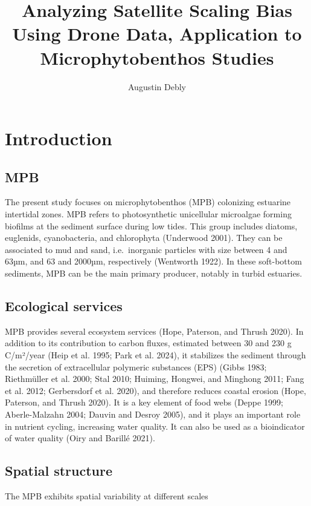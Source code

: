 \documentclass[
  letterpaper,
  DIV=11,
  numbers=noendperiod]{scrartcl}
\title{Analyzing Satellite Scaling Bias Using Drone Data, Application to
Microphytobenthos Studies}
\author{Augustin Debly}
\date{}
\begin{document}
\maketitle

\section{Introduction}\label{introduction}

\subsection{MPB}\label{mpb}

The present study focuses on microphytobenthos (MPB) colonizing
estuarine intertidal zones. MPB refers to photosynthetic unicellular
microalgae forming biofilms at the sediment surface during low tides.
This group includes diatoms, euglenids, cyanobacteria, and chlorophyta
(Underwood 2001). They can be associated to mud and sand, i.e.~inorganic
particles with size between 4 and 63µm, and 63 and 2000µm, respectively
(Wentworth 1922). In these soft-bottom sediments, MPB can be the main
primary producer, notably in turbid estuaries.

\subsection{Ecological services}\label{ecological-services}

MPB provides several ecosystem services (Hope, Paterson, and Thrush
2020). In addition to its contribution to carbon fluxes, estimated
between 30 and 230 g C/m²/year (Heip et al. 1995; Park et al. 2024), it
stabilizes the sediment through the secretion of extracellular polymeric
substances (EPS) (Gibbs 1983; Riethmüller et al. 2000; Stal 2010;
Huiming, Hongwei, and Minghong 2011; Fang et al. 2012; Gerbersdorf et
al. 2020), and therefore reduces coastal erosion (Hope, Paterson, and
Thrush 2020). It is a key element of food webs (Deppe 1999;
Aberle-Malzahn 2004; Dauvin and Desroy 2005), and it plays an important
role in nutrient cycling, increasing water quality. It can also be used
as a bioindicator of water quality (Oiry and Barillé 2021).

\subsection{Spatial structure}\label{spatial-structure}

The MPB exhibits spatial variability at different scales
\end{document}
